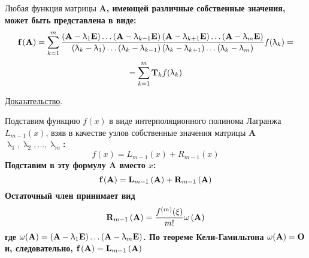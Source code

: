 \documentclass[../../calc-math-exam-2023.tex]{subfiles}
\begin{document}
    \begin{theorem}
        Любая функция матрицы \bf{A}, имеющей различные собственные значения, может быть представлена в виде:
        \begin{equation}
            \bf{f}\left( \bf{A} \right) = \sum_{k=1}^{m} \frac{\left( \bf{A} - \uplambda_1 \bf{E} \right)\dots \left( \bf{A} - \uplambda_{k-1} \bf{E} \right)\left( \bf{A} - \uplambda_{k+1} \bf{E} \right)\dots \left( \bf{A} - \uplambda_m \bf{E} \right)}{\left( \uplambda_k - \uplambda_1 \right)\dots \left( \uplambda_k - \uplambda_{k-1} \right) \left( \uplambda_k - \uplambda_{k+1} \right)\dots \left( \uplambda_k - \uplambda_m \right)}f(\uplambda_k) = \label{eq:lagrange_sylvester}
        \end{equation}
        \begin{equation*}
            = \sum_{k=1}^{m} \bf{T}_k f(\uplambda_k)
        \end{equation*}

        \underline{Доказательство}.
        \vspace{5pt}

        Подставим функцию $f(x)$ в виде интерполяционного полинома Лагранжа $\displaystyle L_{m-1}(x)$, взяв в качестве
        узлов собственные значения матрицы \bf{A} $\uplambda_1, \uplambda_2, \dots, \uplambda_m$:
        \begin{equation*}
            f(x) = L_{m-1}(x) + R_{m-1}(x)
        \end{equation*}
        Подставим в эту формулу \bf{A} вместо $x$:
        \begin{equation*}
            \bf{f}\left( \bf{A} \right) = \bf{L}_{m-1}\left( \bf{A} \right) + \bf{R}_{m-1}\left( \bf{A} \right)
        \end{equation*}
        Остаточный член принимает вид
        \begin{equation*}
            \bf{R}_{m-1}\left( \bf{A} \right) = \frac{f^{(m)}(\xi)}{m!}\omega\left( \bf{A} \right)
        \end{equation*}
        где $\displaystyle \omega(\bf{A}) = \left( \bf{A} - \uplambda_1 \bf{E} \right)\dots \left( \bf{A} - \uplambda_m \bf{E} \right)$.
        По теореме Кели-Гамильтона $\omega(\bf{A}) = \bf{O}$ и, следовательно, $\displaystyle \bf{f}\left( \bf{A} \right) = \bf{L}_{m-1}\left( \bf{A} \right)$
    \end{theorem}
\end{document}
